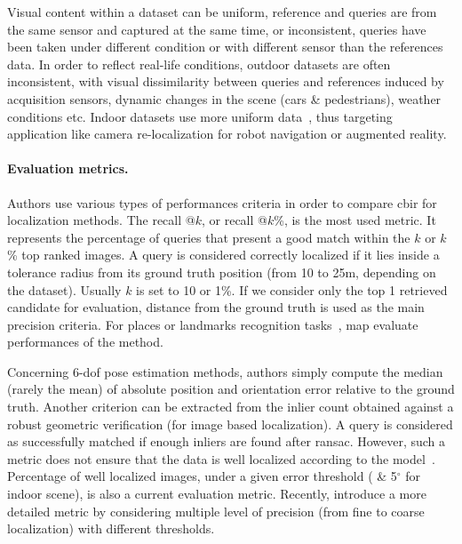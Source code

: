 		Visual content within a dataset can be uniform, reference and queries are from the same sensor and captured at the same time, or inconsistent, queries have been taken under different condition or with different sensor than the references data. In order to reflect real-life conditions, outdoor datasets are often inconsistent, with visual dissimilarity between queries and references induced by acquisition sensors, dynamic changes in the scene (cars \& pedestrians),  weather conditions etc. Indoor datasets use more uniform data~\citep{Shotton2013}, thus targeting application like camera re-localization for robot navigation or augmented reality.

		\paragraph{Evaluation metrics.}
		\label{subsec:evaluation_metric}
			Authors use various types of performances criteria in order to compare \ac{cbir} for localization methods. The recall @$k$, or recall @$k$\%, is the most used metric. It represents the percentage of queries that present a good match within the $k$ or $k$\% top ranked images. A query is considered correctly localized if it lies inside a tolerance radius from its ground truth position (from 10 to 25m, depending on the dataset).  Usually $k$ is set to 10 or 1\%. If we consider only the top 1 retrieved candidate for evaluation, distance from the ground truth is used as the main precision criteria. For places or landmarks recognition tasks~\citep{Radenovic2018}, \ac{map} evaluate performances of the method.
			
			Concerning 6-\ac{dof} pose estimation methods, authors simply compute the median (rarely the mean) of absolute position and orientation error relative to the ground truth. Another criterion can be extracted from the inlier count obtained against a robust geometric verification (for image based localization). A query is considered as successfully matched if enough inliers are found after \ac{ransac}. However, such a metric does not ensure that the data is well localized according to the model~\citep{Sattler2015}. Percentage of well localized images, \ie under a given error threshold (\eg 5cm \& 5$^{\circ}$ for indoor scene), is also a current evaluation metric.  Recently, \citet{Sattler2018} introduce a more detailed metric by considering multiple level of precision (from fine to coarse localization) with different thresholds.
			
	 
			
